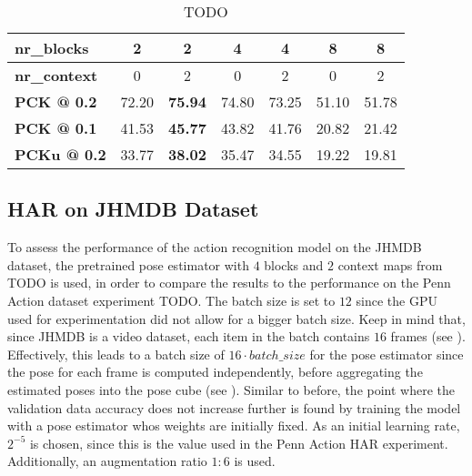 \begin{table}[]
    \small
    \centering
    \begin{tabular}{|l|c|c|c|c|c|c|}
    \hline
        \textbf{nr\_blocks} & 2 & 2 & 4 & 4 & 8 & 8 \\ \hline
        \textbf{nr\_context} & 0 & 2 & 0 & 2 & 0 & 2 \\ \hline
        \textbf{PCK @ 0.2} & 72.20 & \textbf{75.94} & 74.80 & 73.25 & 51.10 & 51.78 \\ \hline
        \textbf{PCK @ 0.1} & 41.53 & \textbf{45.77} & 43.82 & 41.76 & 20.82 & 21.42 \\ \hline
        \textbf{PCKu @ 0.2} & 33.77 & \textbf{38.02} & 35.47 & 34.55 & 19.22 & 19.81 \\ \hline
    \end{tabular}
    \caption{TODO}
    \label{tab:jhmdb_results_estimated}
\end{table}




\subsection{HAR on JHMDB Dataset}
To assess the performance of the action recognition model on the JHMDB dataset, the pretrained pose estimator with $4$ blocks and $2$ context maps from TODO is used, in order to compare the results to the performance on the Penn Action dataset experiment TODO.
The batch size is set to $12$ since the GPU used for experimentation did not allow for a bigger batch size.
Keep in mind that, since JHMDB is a video dataset, each item in the batch contains $16$ frames (see ).
Effectively, this leads to a batch size of $16 \cdot batch\_size$ for the pose estimator since the pose for each frame is computed independently, before aggregating the estimated poses into the pose cube (see ).
Similar to before, the point where the validation data accuracy does not increase further is found by training the model with a pose estimator whos weights are initially fixed.
As an initial learning rate, $2^{-5}$ is chosen, since this is the value used in the Penn Action HAR experiment.
Additionally, an augmentation ratio $1:6$ is used.

